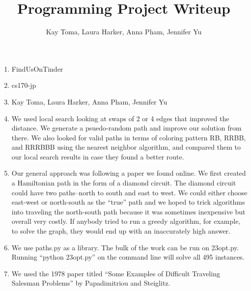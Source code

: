 \documentclass{article}
\begin{document}
\title{Programming Project Writeup}
\author{Kay Toma, Laura Harker, Anna Pham, Jennifer Yu}

\maketitle

\begin{enumerate}
\item FindUsOnTinder
\item cs170-jp
\item Kay Toma, Laura Harker, Anna Pham, Jennifer Yu
\item We used local search looking at swaps of 2 or 4 edges that improved the distance. We generate a psuedo-random path and improve our solution from there. We also looked for valid paths in terms of coloring pattern RB, RRBB, and RRRBBB using the nearest neighbor algorithm, and compared them to our local search results in case they found a better route.
\item Our general approach was following a paper we found online. We first created a Hamiltonian path in the form of a diamond circuit. The diamond circuit could have two paths--north to south and east to west. We could either choose east-west or north-south as the ``true'' path and we hoped to trick algorithms into traveling the north-south path because it was sometimes inexpensive but overall very costly. If anybody tried to run a greedy algorithm, for example, to solve the graph, they would end up with an inaccurately high answer. 
\item We use paths.py as a library. The bulk of the work can be run on 23opt.py. Running ``python 23opt.py'' on the command line will solve all 495 instances. 
\item We used the 1978 paper titled ``Some Examples of Difficult Traveling Salesman Problems'' by Papadimitriou and Steiglitz. 
\end{enumerate}
\end{document}
